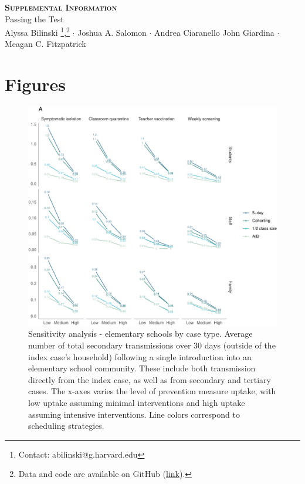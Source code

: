 \documentclass[
]{article}
\author{}
\date{\vspace{-2.5em}}
\begin{document}
\begin{center} 
    \textbf{\scshape \LARGE Supplemental Information}\\  \vspace{2mm}
    {\large Passing the Test}\\ \vspace{2mm} 
    {\large Alyssa Bilinski \footnote{Contact: abilinski@g.harvard.edu},\footnote{Data and code are available on GitHub (\href{https://github.com/abilinski/BackToSchool2}{link}).} $\cdot$ Joshua A. Salomon $\cdot$ Andrea Ciaranello \newline John Giardina $\cdot$ Meagan C. Fitzpatrick} \\
\end{center}

\hypertarget{figures}{%
\section{Figures}\label{figures}}

\begin{figure}
\centering
\includegraphics{Schools_supplement_files/figure-latex/figs1-1.pdf}
\caption{Sensitivity analysis - elementary schools by case type. Average
number of total secondary transmissions over 30 days (outside of the
index case's household) following a single introduction into an
elementary school community. These include both transmission directly
from the index case, as well as from secondary and tertiary cases. The
x-axes varies the level of prevention measure uptake, with low uptake
assuming minimal interventions and high uptake assuming intensive
interventions. Line colors correspond to scheduling strategies.}
\end{figure}
\end{document}
